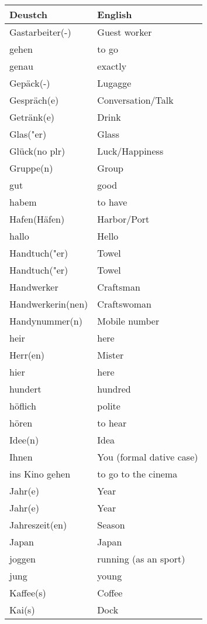 \documentclass{article}
\renewcommand{\arraystretch}{1}
\begin{document}
\newpage

\begin{minipage}{0.48\textwidth}
    \centering
    \renewcommand{\arraystretch}{1.5}
    \begin{tabular}{|>{\raggedright\arraybackslash}p{3.5cm}|>{\raggedright\arraybackslash}p{3.5cm}|}
        \hline
        \rowcolor{gray!20} \textbf{Deustch} & \textbf{English} \\
        \hline
        Gastarbeiter(-) & Guest worker \\\hline
        gehen & to go \\\hline
        genau & exactly \\\hline
        Gepäck(-) & Lugagge \\\hline
        Gespräch(e) & Conversation/Talk \\\hline
        Getränk(e) & Drink \\\hline
        Glas("er) & Glass \\\hline
        Glück(no plr) & Luck/Happiness \\\hline
        Gruppe(n) & Group \\\hline
        gut & good \\\hline
        habem & to have \\\hline
        Hafen(Häfen) & Harbor/Port \\\hline
        hallo & Hello \\\hline
        Handtuch("er) & Towel \\\hline
        Handtuch("er) & Towel \\\hline
        Handwerker & Craftsman \\\hline
        Handwerkerin(nen) & Craftswoman \\\hline
        Handynummer(n) & Mobile number \\\hline
        heir & here \\\hline
        Herr(en) & Mister \\\hline
        hier & here \\\hline
        hundert &  hundred \\\hline
        höflich & polite \\\hline
        hören & to hear \\\hline
        Idee(n) & Idea \\\hline
        Ihnen & You (formal dative case) \\\hline
        ins Kino gehen & to go to the cinema \\\hline
        Jahr(e) & Year \\\hline
        Jahr(e) & Year \\\hline
        Jahreszeit(en) & Season \\\hline
        Japan & Japan \\\hline
        joggen & running (as an sport) \\\hline
        jung & young \\\hline
        Kaffee(s) & Coffee \\\hline
        Kai(s) & Dock \\\hline
    \end{tabular}
\end{minipage}%
\end{document}
